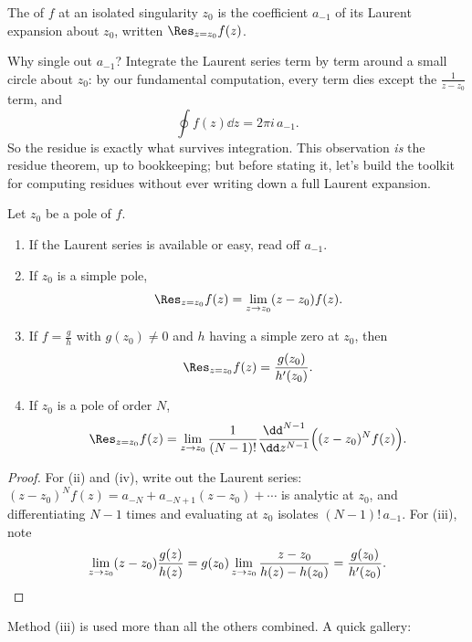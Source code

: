 \begin{definition}[Residue]
	The  of $f$ at an isolated singularity $z_0$ is the coefficient $a_{-1}$ of its Laurent expansion about $z_0$, written $\Res_{z = z_0} f(z)$.
\end{definition}

Why single out $a_{-1}$? Integrate the Laurent series term by term around a small circle about $z_0$: by our fundamental computation, every term dies except the $\frac{1}{z - z_0}$ term, and
$$
\oint f(z) \dd z = 2\pi i \, a_{-1}.
$$
So the residue is exactly what survives integration. This observation \emph{is} the residue theorem, up to bookkeeping; but before stating it, let's build the toolkit for computing residues without ever writing down a full Laurent expansion.

\begin{proposition}
	Let $z_0$ be a pole of $f$.
	\begin{enumerate}[label=(\roman*)]
		\item If the Laurent series is available or easy, read off $a_{-1}$.
		\item If $z_0$ is a simple pole,
		$$
		\Res_{z = z_0} f(z) = \lim_{z \to z_0} (z - z_0) f(z).
		$$
		\item If $f = \frac{g}{h}$ with $g(z_0) \neq 0$ and $h$ having a simple zero at $z_0$, then
		$$
		\Res_{z = z_0} f(z) = \frac{g(z_0)}{h'(z_0)}.
		$$
		\item If $z_0$ is a pole of order $N$,
		$$
		\Res_{z = z_0} f(z) = \lim_{z \to z_0} \frac{1}{(N-1)!} \frac{\dd^{N - 1}}{\dd z^{N - 1}} \Big( (z - z_0)^N f(z) \Big).
		$$
	\end{enumerate}
\end{proposition}
\begin{proof}
	For (ii) and (iv), write out the Laurent series: $(z - z_0)^N f(z) = a_{-N} + a_{-N + 1}(z - z_0) + \cdots$ is analytic at $z_0$, and differentiating $N - 1$ times and evaluating at $z_0$ isolates $(N-1)! \, a_{-1}$. For (iii), note
	$$
	\lim_{z \to z_0} (z - z_0)\frac{g(z)}{h(z)} = g(z_0) \lim_{z \to z_0} \frac{z - z_0}{h(z) - h(z_0)} = \frac{g(z_0)}{h'(z_0)}. \qedhere
	$$
\end{proof}

Method (iii) is used more than all the others combined. A quick gallery:

